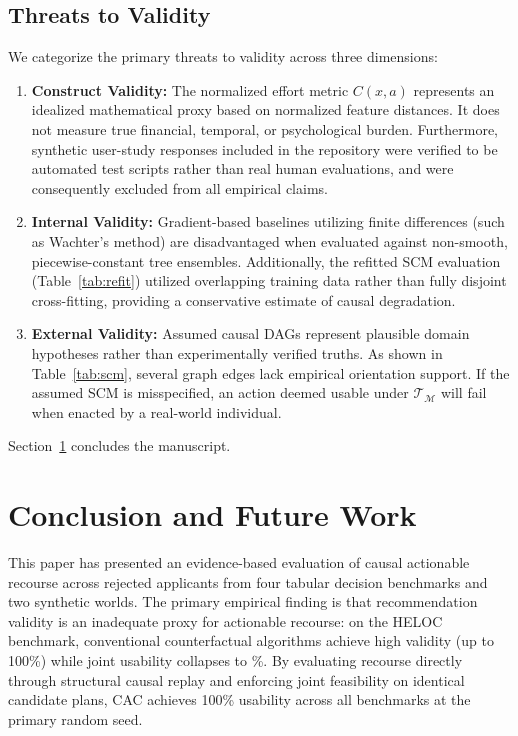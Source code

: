 \documentclass[nolineno]{paper/ieee-access/ieeeaccess}%
\newcommand{\CAC}{CAC}
\newcommand{\SCM}{\ensuremath{\mathcal{M}}}
\newcommand{\Replay}{\ensuremath{\mathcal{T}_{\SCM}}}
\begin{document}
\subsection{Threats to Validity}
We categorize the primary threats to validity across three dimensions:
\begin{enumerate}
\item \textbf{Construct Validity:} The normalized effort metric $C(x, a)$ represents an idealized mathematical proxy based on normalized feature distances. It does not measure true financial, temporal, or psychological burden. Furthermore, synthetic user-study responses included in the repository were verified to be automated test scripts rather than real human evaluations, and were consequently excluded from all empirical claims.
\item \textbf{Internal Validity:} Gradient-based baselines utilizing finite differences (such as Wachter's method) are disadvantaged when evaluated against non-smooth, piecewise-constant tree ensembles. Additionally, the refitted SCM evaluation (Table~\ref{tab:refit}) utilized overlapping training data rather than fully disjoint cross-fitting, providing a conservative estimate of causal degradation.
\item \textbf{External Validity:} Assumed causal DAGs represent plausible domain hypotheses rather than experimentally verified truths. As shown in Table~\ref{tab:scm}, several graph edges lack empirical orientation support. If the assumed SCM is misspecified, an action deemed usable under $\Replay$ will fail when enacted by a real-world individual.
\end{enumerate}

Section~\ref{sec:conclusion} concludes the manuscript.

\section{Conclusion and Future Work}
\label{sec:conclusion}
This paper has presented an evidence-based evaluation of causal actionable recourse across \TotalApplicants{} rejected applicants from four tabular decision benchmarks and two synthetic worlds. The primary empirical finding is that recommendation validity is an inadequate proxy for actionable recourse: on the HELOC benchmark, conventional counterfactual algorithms achieve high validity (up to 100\%) while joint usability collapses to \HelocWachterUsable\%. By evaluating recourse directly through structural causal replay and enforcing joint feasibility on identical candidate plans, \CAC{} achieves 100\% usability across all benchmarks at the primary random seed.
\end{document}
